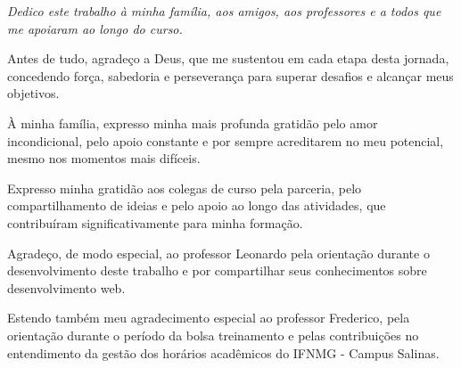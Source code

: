 \documentclass[
	12pt,				%
	twoside,			%
	a4paper,			%
	chapter=TITLE,		%
	section=TITLE,		%
	subsection=TITLE,	%
	subsubsection=TITLE,%
	english,			%
	french,				%
	spanish,			%
	brazil,				%
	]{abntex2}
\date{\normalsize\today} %
\begin{document}
\frenchspacing          %

\pretextual

\imprimircapa                   

\imprimirfolhaderosto

\newpage

\begin{dedicatoria}
   \vspace*{\fill}
   \centering
   \noindent
   \textit{Dedico este trabalho à minha família, aos amigos, aos professores e a todos que me apoiaram ao longo do curso.}
   \vspace*{\fill}
\end{dedicatoria}

\begin{agradecimentos}

Antes de tudo, agradeço a Deus, que me sustentou em cada etapa desta jornada, concedendo força, sabedoria e perseverança para superar desafios e alcançar meus objetivos.

À minha família, expresso minha mais profunda gratidão pelo amor incondicional, pelo apoio constante e por sempre acreditarem no meu potencial, mesmo nos momentos mais difíceis.

Expresso minha gratidão aos colegas de curso pela parceria, pelo compartilhamento de ideias e pelo apoio ao longo das atividades, que contribuíram significativamente para minha formação.

Agradeço, de modo especial, ao professor Leonardo pela orientação durante o desenvolvimento deste trabalho e por compartilhar seus conhecimentos sobre desenvolvimento web.

Estendo também meu agradecimento especial ao professor Frederico, pela orientação durante o período da bolsa treinamento e pelas contribuições no entendimento da gestão dos horários acadêmicos do IFNMG - Campus Salinas.

\end{agradecimentos}

\setlength{\absparsep}{18pt} %
\end{document}
